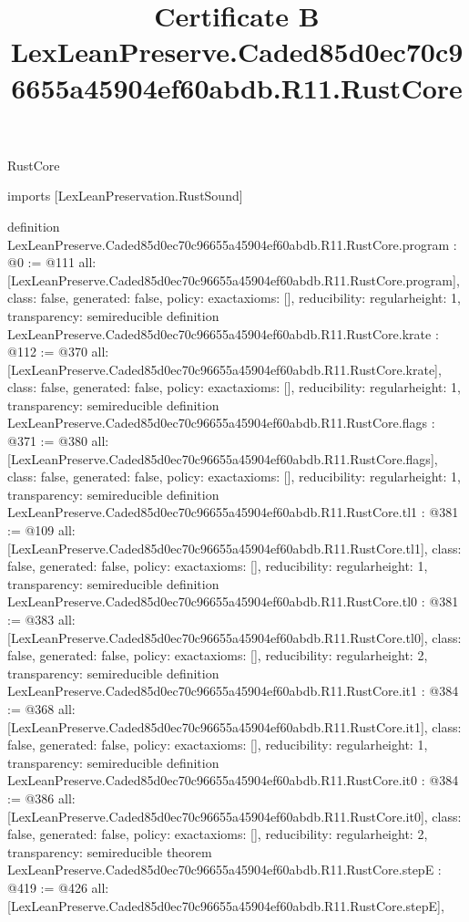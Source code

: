 \begin{lexlean}{RustCore}
\title{Certificate B LexLeanPreserve.Caded85d0ec70c96655a45904ef60abdb.R11.RustCore}
\begin{coremodule}
imports [LexLeanPreservation.RustSound]

definition LexLeanPreserve.Caded85d0ec70c96655a45904ef60abdb.R11.RustCore.program : @0 := @111 {
  all: [LexLeanPreserve.Caded85d0ec70c96655a45904ef60abdb.R11.RustCore.program],
  class: false,
  generated: false,
  policy: exact{axioms: []},
  reducibility: regular{height: 1},
  transparency: semireducible
}
definition LexLeanPreserve.Caded85d0ec70c96655a45904ef60abdb.R11.RustCore.krate : @112 := @370 {
  all: [LexLeanPreserve.Caded85d0ec70c96655a45904ef60abdb.R11.RustCore.krate],
  class: false,
  generated: false,
  policy: exact{axioms: []},
  reducibility: regular{height: 1},
  transparency: semireducible
}
definition LexLeanPreserve.Caded85d0ec70c96655a45904ef60abdb.R11.RustCore.flags : @371 := @380 {
  all: [LexLeanPreserve.Caded85d0ec70c96655a45904ef60abdb.R11.RustCore.flags],
  class: false,
  generated: false,
  policy: exact{axioms: []},
  reducibility: regular{height: 1},
  transparency: semireducible
}
definition LexLeanPreserve.Caded85d0ec70c96655a45904ef60abdb.R11.RustCore.tl1 : @381 := @109 {
  all: [LexLeanPreserve.Caded85d0ec70c96655a45904ef60abdb.R11.RustCore.tl1],
  class: false,
  generated: false,
  policy: exact{axioms: []},
  reducibility: regular{height: 1},
  transparency: semireducible
}
definition LexLeanPreserve.Caded85d0ec70c96655a45904ef60abdb.R11.RustCore.tl0 : @381 := @383 {
  all: [LexLeanPreserve.Caded85d0ec70c96655a45904ef60abdb.R11.RustCore.tl0],
  class: false,
  generated: false,
  policy: exact{axioms: []},
  reducibility: regular{height: 2},
  transparency: semireducible
}
definition LexLeanPreserve.Caded85d0ec70c96655a45904ef60abdb.R11.RustCore.it1 : @384 := @368 {
  all: [LexLeanPreserve.Caded85d0ec70c96655a45904ef60abdb.R11.RustCore.it1],
  class: false,
  generated: false,
  policy: exact{axioms: []},
  reducibility: regular{height: 1},
  transparency: semireducible
}
definition LexLeanPreserve.Caded85d0ec70c96655a45904ef60abdb.R11.RustCore.it0 : @384 := @386 {
  all: [LexLeanPreserve.Caded85d0ec70c96655a45904ef60abdb.R11.RustCore.it0],
  class: false,
  generated: false,
  policy: exact{axioms: []},
  reducibility: regular{height: 2},
  transparency: semireducible
}
theorem LexLeanPreserve.Caded85d0ec70c96655a45904ef60abdb.R11.RustCore.stepE : @419 := @426 {
  all: [LexLeanPreserve.Caded85d0ec70c96655a45904ef60abdb.R11.RustCore.stepE],
}
\end{coremodule}
\end{lexlean}
